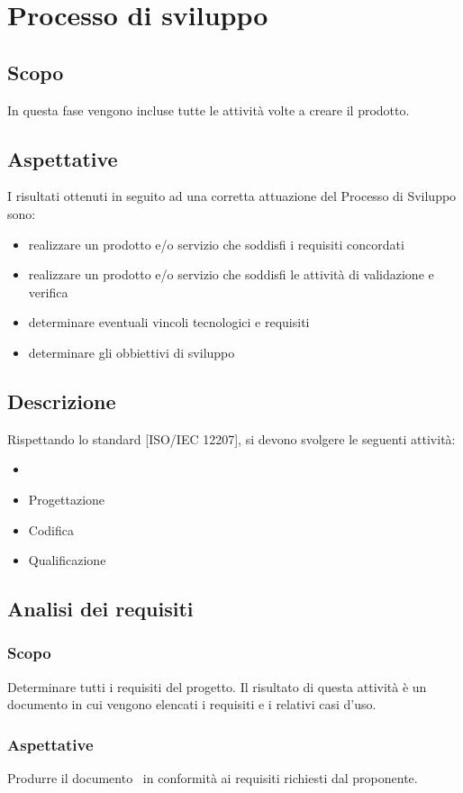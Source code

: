 \documentclass[../NormeDiProgetto.tex]{subfiles}
\begin{document}
	\section{Processo di sviluppo}
		\subsection{Scopo}
			In questa fase vengono incluse tutte le attività volte a creare il prodotto.
		\subsection{Aspettative}
			I risultati ottenuti in seguito ad una corretta attuazione del Processo di Sviluppo sono:
			\begin{itemize}
				\item realizzare un prodotto e/o servizio che soddisfi i requisiti concordati
				\item realizzare un prodotto e/o servizio che soddisfi le attività di validazione e verifica
				\item determinare eventuali vincoli tecnologici e requisiti
				\item determinare gli obbiettivi di sviluppo
			\end{itemize}
		\subsection{Descrizione}
			Rispettando lo standard [ISO/IEC 12207], si devono svolgere le seguenti attività:
			\begin{itemize}
				\item \analisideirequisiti\
				\item Progettazione
				\item Codifica
				\item Qualificazione
			\end{itemize}
		\subsection{Analisi dei requisiti}
			\subsubsection{Scopo}
				Determinare tutti i requisiti del progetto. Il risultato di questa attività è un documento in cui vengono elencati i requisiti e i relativi casi d'uso.
			\subsubsection{Aspettative}
				Produrre il documento \analisideirequisiti\ in conformità ai requisiti richiesti dal proponente.
\end{document}

